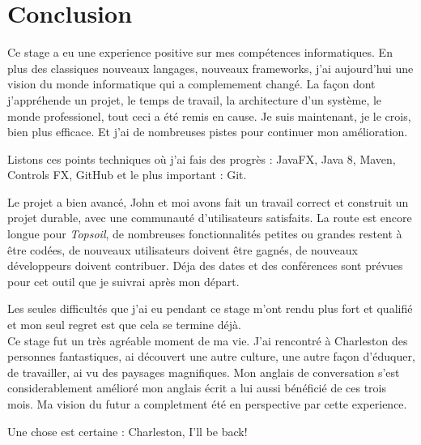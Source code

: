 \chapter{Conclusion}
Ce stage a eu une experience positive sur mes compétences informatiques. En plus des classiques nouveaux langages, nouveaux frameworks, j'ai aujourd'hui une vision du monde informatique qui a complemement changé. La façon dont j'appréhende un projet, le temps de travail, la architecture d'un système, le monde professionel, tout ceci a été remis en cause. Je suis maintenant, je le crois, bien plus efficace. Et j'ai de nombreuses pistes pour continuer mon amélioration.

Listons ces points techniques où j'ai fais des progrès : JavaFX, Java 8, Maven, Controls FX, GitHub et le plus important : Git. 

Le projet a bien avancé, John et moi avons fait un travail correct et construit un projet durable, avec une communauté d'utilisateurs satisfaits. La route est encore longue pour \textit{Topsoil}, de nombreuses fonctionnalités petites ou grandes restent à être codées, de nouveaux utilisateurs doivent être gagnés, de nouveaux développeurs doivent contribuer. Déja des dates et des conférences sont prévues pour cet outil que je suivrai après mon départ.

Les seules difficultés que j'ai eu pendant ce stage m'ont rendu plus fort et qualifié et mon seul regret est que cela se termine déjà.\\

Ce stage fut un très agréable moment de ma vie. J'ai rencontré à Charleston des personnes fantastiques, ai découvert une autre culture, une autre façon d'éduquer, de travailler, ai vu des paysages magnifiques. Mon anglais de conversation s'est considerablement amélioré mon anglais écrit a lui aussi bénéficié de ces trois mois. Ma vision du futur a completment été en perspective par cette experience.

Une chose est certaine : Charleston, I'll be back!
